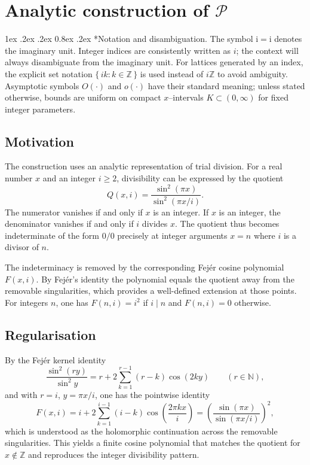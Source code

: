 \documentclass[11pt,a4paper]{amsart}
\makeatletter
\newcommand{\ii}{\mathrm{i}} %
\renewcommand\paragraph{\@startsection{paragraph}{4}{\z@}%
  {1ex \@plus .2ex \@minus .2ex}%
  {0.8ex \@plus .2ex}%
  {\normalfont\bfseries}}
\theoremstyle{plain}
\theoremstyle{definition}
\theoremstyle{remark}
\makeatother
\begin{document}

\section{Analytic construction of $\mathcal{P}$}

\paragraph*{Notation and disambiguation.}
The symbol $\ii=\mathrm{i}$ denotes the imaginary unit. Integer indices are consistently written as $i$; the context will always disambiguate from the imaginary unit. For lattices generated by an index, the explicit set notation $\{\, i k : k\in\mathbb{Z}\,\}$ is used instead of $i\mathbb{Z}$ to avoid ambiguity. Asymptotic symbols $O(\cdot)$ and $o(\cdot)$ have their standard meaning; unless stated otherwise, bounds are uniform on compact $x$–intervals $K\subset(0,\infty)$ for fixed integer parameters.

\subsection{Motivation}\label{subsec:motivation}
The construction uses an analytic representation of trial division. For a real number $x$ and an integer $i \ge 2$, divisibility can be expressed by the quotient
\[
Q(x,i) = \frac{\sin^2(\pi x)}{\sin^2(\pi x/i)}.
\]
The numerator vanishes if and only if $x$ is an integer. If $x$ is an integer, the denominator vanishes if and only if $i$ divides $x$. The quotient thus becomes indeterminate of the form $0/0$ precisely at integer arguments $x=n$ where $i$ is a divisor of $n$.

The indeterminacy is removed by the corresponding Fejér cosine polynomial $F(x,i)$. By Fejér’s identity the polynomial equals the quotient away from the removable singularities, which provides a well-defined extension at those points. For integers $n$, one has $F(n,i)=i^2$ if $i\mid n$ and $F(n,i)=0$ otherwise.

\subsection{Regularisation}
By the Fejér kernel identity~\cite{zygmund2002}
\[
\frac{\sin^{2}(r y)}{\sin^{2}y}=r+2\sum_{k=1}^{r-1}(r-k)\cos(2k y)\qquad (r\in\mathbb N),
\]
and with \(r=i\), \(y=\pi x/i\), one has the pointwise identity
\[
F(x,i)=i+2\sum_{k=1}^{i-1}(i-k)\cos\!\left(\frac{2\pi k x}{i}\right)
=\left(\frac{\sin(\pi x)}{\sin(\pi x/i)}\right)^{\!2},
\]
which is understood as the holomorphic continuation across the removable singularities. This yields a finite cosine polynomial that matches the quotient for \(x\notin\mathbb{Z}\) and reproduces the integer divisibility pattern.
\end{document}
